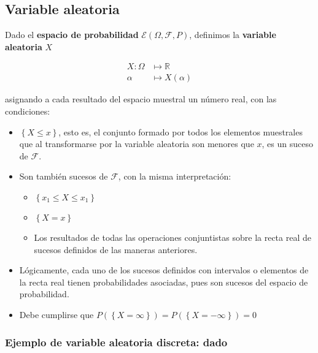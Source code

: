 \documentclass[11pt]{article}
\providecommand{\tightlist}{%
      \setlength{\itemsep}{0pt}\setlength{\parskip}{0pt}}
\begin{document}
    \hypertarget{variable-aleatoria}{%
\subsection*{Variable aleatoria}\label{variable-aleatoria}}

Dado el \textbf{espacio de probabilidad}
\(\mathscr{E}(\Omega, \mathscr{F}, P)\), definimos la \textbf{variable
aleatoria} \(X\)

\begin{align*}
X:  \mathscr{\Omega} & \longmapsto \mathbb{R}\\
   \alpha & \longmapsto X(\alpha)
   \end{align*}
 

asignando a cada resultado del espacio muestral un número real, con las
condiciones:

\begin{itemize}
\tightlist
\item
  \(\left\{X \leq x \right\}\), esto es, el conjunto formado por todos
  los elementos muestrales que al transformarse por la variable
  aleatoria son menores que \(x\), es un suceso de \(\mathscr{F}\).
\item
  Son también sucesos de \(\mathscr{F}\), con la misma interpretación:

  \begin{itemize}
  \tightlist
  \item
    \(\left\{x_1 \leq X \leq x_1 \right\}\)
  \item
    \(\left\{X = x \right\}\)
  \item
    Los resultados de todas las operaciones conjuntistas sobre la recta
    real de sucesos definidos de las maneras anteriores.
  \end{itemize}
\item
  Lógicamente, cada uno de los sucesos definidos con intervalos o
  elementos de la recta real tienen probabilidades asociadas, pues son
  sucesos del espacio de probabilidad.
\item
  Debe cumplirse que
  \(P(\left\{X = \infty \right\})=P(\left\{X = -\infty \right\})=0\)
\end{itemize}

    \hypertarget{ejemplo-de-variable-aleatoria-discreta-dado}{%
\subsubsection*{Ejemplo de variable aleatoria discreta:
dado}\label{ejemplo-de-variable-aleatoria-discreta-dado}}
\end{document}
